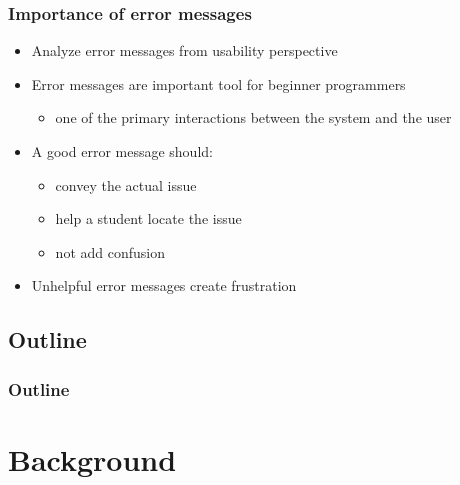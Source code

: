 \documentclass{beamer}
\begin{document}
\begin{frame}
  \frametitle{Importance of error messages}
  \begin{itemize}
    \item Analyze error messages from usability perspective
  	\item Error messages are important tool for beginner programmers
  	\begin{itemize}
  		\item one of the primary interactions between the system and the user
  	\end{itemize}
  	\item A good error message should:
  	\begin{itemize}
  		\item convey the actual issue
  		\item help a student locate the issue
  		\item not add confusion
  	\end{itemize}
  	\item Unhelpful error messages create frustration
  \end{itemize}
\end{frame}



\subsection*{Outline}

\begin{frame}
  \frametitle{Outline}
  \tableofcontents
\end{frame}

\section[Background]{Background}
\end{document}
